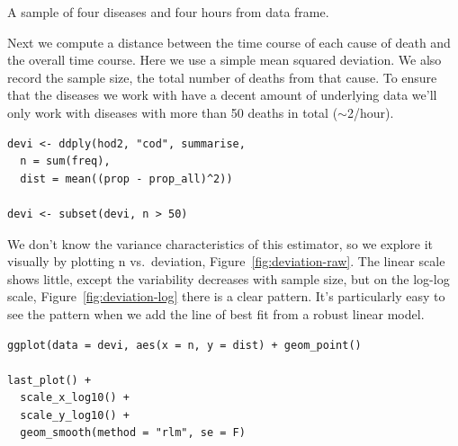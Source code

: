 \documentclass[article]{jss}
\begin{document}
\begin{table}[htbp]
  \centering
  \subfloat[]{
    \label{tbl:counts:1}
  }%
  \subfloat[]{
    \label{tbl:counts:2}
  }%
  \subfloat[]{
    \label{tbl:counts:3}
  }%
  \subfloat[]{
    \label{tbl:counts:4}
  }
  
  \caption{A sample of four diseases and four hours from  data frame.}
  \label{tbl:counts}
\end{table}

Next we compute a distance between the time course of each cause of death and the overall time course. Here we use a simple mean squared deviation.  We also record the sample size, the total number of deaths from that cause. To ensure that the diseases we work with have a decent amount of underlying data we'll only 
work with diseases with more than 50 deaths in total ($\sim$2/hour).

\begin{Verbatim}
devi <- ddply(hod2, "cod", summarise, 
  n = sum(freq), 
  dist = mean((prop - prop_all)^2))

devi <- subset(devi, n > 50)
\end{Verbatim}

We don't know the variance characteristics of this estimator, so we explore it visually by plotting n vs.\ deviation, Figure~\ref{fig:deviation-raw}. The linear scale shows little, except the variability decreases with sample size, but on the log-log scale, Figure~\ref{fig:deviation-log} there is a clear pattern. It's particularly easy to see the pattern when we add the line of best fit from a robust linear model. 

\begin{Verbatim}
ggplot(data = devi, aes(x = n, y = dist) + geom_point()

last_plot() + 
  scale_x_log10() + 
  scale_y_log10() +
  geom_smooth(method = "rlm", se = F)
\end{Verbatim}
\end{document}
